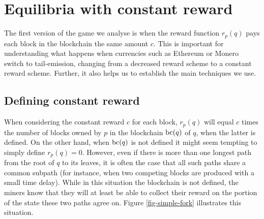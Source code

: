 

\section{Equilibria %
with constant reward}
\label{sec-const_rew}

The first version of the game we analyse is when the reward function $r_p(q)$ pays each block in the blockchain the same amount $c$. This is important for understanding what happens 
when currencies such as Ethereum or Monero switch to tail-emission, changing from a decreased reward scheme to a constant reward scheme. Further, it also helps us to establish the main techniques we use. 


\subsection{Defining constant reward}
When considering the constant reward $c$ for each block, $r_p(q)$ will equal $c$ times the number of blocks owned by $p$ in the blockchain $\text{bc}(q)$ of $q$, when the latter is defined. On the other hand, when $\text{bc}(q)$ is not defined it might seem tempting to simply define $r_p(q) = 0$. However, even if there is more than one longest path from the root of $q$ to its leaves, it is often the case that all such paths share a common subpath (for instance, when two competing blocks are produced with a small time delay). 
While in this situation the blockchain is not defined, the miners know that they will at least be able to collect their reward on the portion of the state these two paths agree on. Figure \ref{fig-simple-fork} illustrates this situation. 

